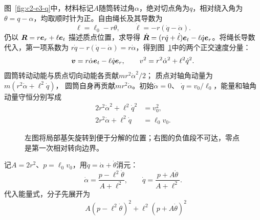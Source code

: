 \begin{solution}
图~\ref{fig:c2-e3-q}中，材料标记$A$随筒转过角$\alpha$，绝对切点角为$q$，相对绕入角为$\theta=q-\alpha$，均取顺时针为正。自由绳长及其导数为
\[
 \ell=\ell_0-r\theta,\qquad
 \dot\ell=-r(\dot q-\dot\alpha).
\]
仍以 $\bm{R}=r\bm{e}_r+\ell\bm{e}_t$ 描述质点位置，求导得 $\dot{\bm{R}}=(r\dot q+\dot\ell)\bm{e}_t-\ell\dot q\bm{e}_r$。将绳长导数代入，第一项系数为 $r\dot q-r(\dot q-\dot\alpha)=r\dot\alpha$，得到图~\ref{fig:c2-e3-s}中的两个正交速度分量：
\[
 \bm{v}=r\dot\alpha\bm{e}_t-\ell\dot q\bm{e}_r,\qquad
 v^2=r^2\dot\alpha^2+\ell^2\dot q^2.
\]
圆筒转动动能与质点切向动能各贡献$mr^2\dot\alpha^2/2$；
质点对轴角动量为$m(r^2\dot\alpha+\ell^2\dot q)$，
圆筒自身再贡献$mr^2\dot\alpha$。初始$\dot\alpha=0$、
$\dot q=v_0/\ell_0$，能量和轴角动量守恒分别写成
\begin{align}
 2r^2\dot\alpha^2+\ell^2\dot q^2&=v_0^2,
 \label{eq:c2-windE}\\
 2r^2\dot\alpha+\ell^2\dot q&=\ell_0v_0.
 \label{eq:c2-windL}
\end{align}
\begin{figure}[H]\centering
{}
\caption{左图将局部基矢旋转到便于分解的位置；右图的负值段不可达，零点是第一次相对转向边界。}\label{fig:c2-e3-s}
\end{figure}
记$A=2r^2$、$p=\ell_0v_0$，用$\dot q=\dot\alpha+\dot\theta$消元：
\[
 \dot\alpha=\frac{p-\ell^2\dot\theta}{A+\ell^2},\qquad
 \dot q=\frac{p+A\dot\theta}{A+\ell^2}.
\]
代入能量式，分子先展开为
\[
\begin{aligned}
&A(p-\ell^2\dot\theta)^2+\ell^2(p+A\dot\theta)^2\\

\end{aligned}\]
\end{solution}

